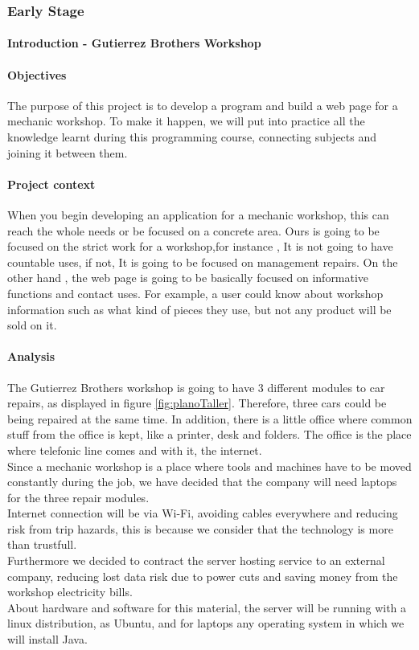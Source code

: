 \documentclass{article}
\begin{document}
\subsubsection{Early Stage}
\paragraph{Introduction - Gutierrez Brothers Workshop}
\paragraph{Objectives}
The purpose of this project is to develop a program and build a web page for a mechanic workshop. To make it happen, we will put into practice all the knowledge learnt during this programming course, connecting subjects and joining it between them. 
\paragraph{Project context}
When you begin developing an application for a mechanic workshop, this can reach the whole needs or be focused on a concrete area. Ours is going to be focused on the strict work for a workshop,for instance , It is not going to have countable uses, if not, It is going to be focused on management repairs. 
On the other hand , the web page is going to be basically focused on informative functions and contact uses. For example, a user could know about workshop information such as what kind of pieces they use, but not any product will be sold on it.
\paragraph{Analysis}
The Gutierrez Brothers workshop is going to have 3 different modules to car repairs, as displayed in figure \ref{fig:planoTaller}. Therefore, three cars could be being repaired at the same time. In addition, there is a little office where common stuff from the office is kept, like a printer, desk and folders. The office is the place where telefonic line comes and with it, the internet. \\
Since a mechanic workshop is a place where tools and machines have to be moved constantly during the job, we have decided that the company will need laptops for the three repair modules. \\
Internet connection will be via Wi-Fi, avoiding cables everywhere and reducing risk from trip hazards, this is because we consider that the technology is more than trustfull. \\
Furthermore we decided to contract the server hosting service to an external company, reducing lost data risk due to power cuts and saving money from the workshop electricity  bills. \\
About hardware and software for this material, the server will be running with a linux distribution, as Ubuntu, and for laptops any operating system in which we will install Java. \\
\end{document}
